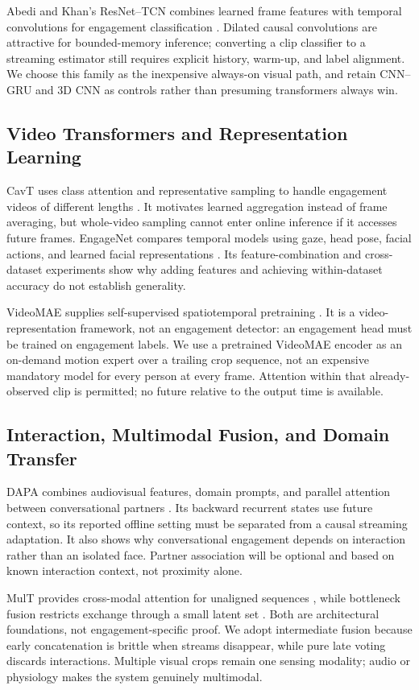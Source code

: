 \documentclass[a4paper,conference]{IEEEtran}
\begin{document}
Abedi and Khan's ResNet--TCN combines learned frame features with temporal convolutions for engagement classification \cite{tcn}. Dilated causal convolutions are attractive for bounded-memory inference; converting a clip classifier to a streaming estimator still requires explicit history, warm-up, and label alignment. We choose this family as the inexpensive always-on visual path, and retain CNN--GRU and 3D CNN as controls rather than presuming transformers always win.

\subsection{Video Transformers and Representation Learning}
CavT uses class attention and representative sampling to handle engagement videos of different lengths \cite{cavt}. It motivates learned aggregation instead of frame averaging, but whole-video sampling cannot enter online inference if it accesses future frames. EngageNet compares temporal models using gaze, head pose, facial actions, and learned facial representations \cite{engagenet}. Its feature-combination and cross-dataset experiments show why adding features and achieving within-dataset accuracy do not establish generality.

VideoMAE supplies self-supervised spatiotemporal pretraining \cite{videomae}. It is a video-representation framework, not an engagement detector: an engagement head must be trained on engagement labels. We use a pretrained VideoMAE encoder as an on-demand motion expert over a trailing crop sequence, not an expensive mandatory model for every person at every frame. Attention within that already-observed clip is permitted; no future relative to the output time is available.

\subsection{Interaction, Multimodal Fusion, and Domain Transfer}
DAPA combines audiovisual features, domain prompts, and parallel attention between conversational partners \cite{dapa}. Its backward recurrent states use future context, so its reported offline setting must be separated from a causal streaming adaptation. It also shows why conversational engagement depends on interaction rather than an isolated face. Partner association will be optional and based on known interaction context, not proximity alone.

MulT provides cross-modal attention for unaligned sequences \cite{mult}, while bottleneck fusion restricts exchange through a small latent set \cite{mbt}. Both are architectural foundations, not engagement-specific proof. We adopt intermediate fusion because early concatenation is brittle when streams disappear, while pure late voting discards interactions. Multiple visual crops remain one sensing modality; audio or physiology makes the system genuinely multimodal.
\end{document}
